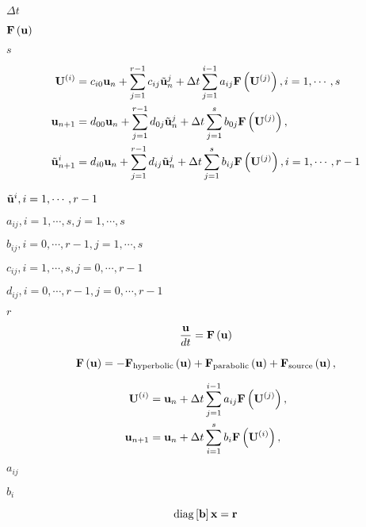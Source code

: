 \documentclass{article}
\begin{document}
$\Delta t$
\pagebreak

${\bf F}\left({\bf u}\right)$
\pagebreak

$s$
\pagebreak

\begin{align} {\bf U}^{\left(i\right)} &= c_{i0}{\bf u}_n + \sum_{j=1}^{r-1} c_{ij} \tilde{\bf u}_n^j + \Delta t \sum_{j=1}^{i-1} a_{ij} {\bf F}\left({\bf U}^{\left(j\right)}\right), i=1,\cdots,s\\ {\bf u}_{n+1} &= d_{00} {\bf u}_n + \sum_{j=1}^{r-1} d_{0j} \tilde{\bf u}_n^j + \Delta t \sum_{j=1}^s b_{0j} {\bf F}\left({\bf U}^{\left(j\right)}\right), \\ \tilde{\bf u}_{n+1}^i &= d_{i0} {\bf u}_n + \sum_{j=1}^{r-1} d_{ij} \tilde{\bf u}_n^j + \Delta t \sum_{j=1}^s b_{ij} {\bf F}\left({\bf U}^{\left(j\right)}\right), i=1,\cdots,r-1 \end{align}
\pagebreak

$\tilde{\bf u}^i, i=1,\cdots,r-1$
\pagebreak

$a_{ij}, i=1,\cdots,s, j=1,\cdots,s$
\pagebreak

$b_{ij}, i=0,\cdots,r-1, j=1,\cdots,s$
\pagebreak

$c_{ij}, i=1,\cdots,s, j=0,\cdots,r-1$
\pagebreak

$d_{ij}, i=0,\cdots,r-1, j=0,\cdots,r-1$
\pagebreak

$r$
\pagebreak

\begin{equation} \frac {{\bf u}}{dt} = {\bf F}\left({\bf u}\right) \end{equation}
\pagebreak

\begin{equation} {\bf F}\left({\bf u}\right) = - {\bf F}_{\rm hyperbolic}\left({\bf u}\right) + {\bf F}_{\rm parabolic} \left({\bf u}\right) + {\bf F}_{\rm source} \left({\bf u}\right), \end{equation}
\pagebreak

\begin{align} {\bf U}^{\left(i\right)} &= {\bf u}_n + \Delta t \sum_{j=1}^{i-1} a_{ij} {\bf F}\left({\bf U}^{\left(j\right)}\right), \\ {\bf u}_{n+1} &= {\bf u}_n + \Delta t \sum_{i=1}^s b_{i} {\bf F}\left({\bf U}^{\left(i\right)}\right), \end{align}
\pagebreak

$a_{ij}$
\pagebreak

$b_i$
\pagebreak

\begin{equation} {\rm diag}\left[{\bf b}\right]{\bf x} = {\bf r} \end{equation}
\pagebreak
\end{document}
